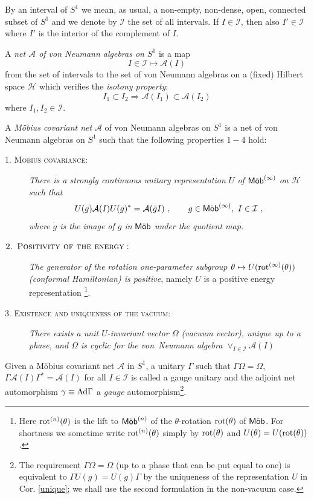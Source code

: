 \documentclass[11pt]{article}
\def\Ad{{\hbox{\rm Ad}}}
\def\g{\gamma}
\def\Ga{\Gamma}
\def\Om{\Omega}
\def\A{{\cal A}}
\def\I{{\cal I}}
\def\H{{\cal H}}
\def\Mob{{\rm\textsf{M\"ob}}}
\def\Mobn{{\rm\textsf{M\"ob}}^{(n)}}
\def\Mobi{{\rm\textsf{M\"ob}}^{(\infty)}}
\def\A{{\mathcal A}}
\def\H{{\mathcal H}}
\def\I{{\mathcal I}}
\begin{document}
By an interval of $S^1$ we mean, as usual, a non-empty, non-dense, open, connected subset of $S^1$ and we denote by $\I$ the set of all intervals. If $I\in\I$, then also $I'\in\I$ where $I'$ is the interior of the complement of $I$. 

A {\it  net $\A$ of von Neumann algebras on $S^1$} is a map
\[
I\in\I\mapsto\A(I)
\]
from the set of intervals to the set of von Neumann algebras on a
(fixed) Hilbert space $\H$ which verifies the \emph{isotony property}:
\[
I_1\subset I_2\Rightarrow  \A(I_1)\subset\A(I_2)
\]
where $I_1 , I_2\in\I$.

A \emph{M\"obius covariant net} $\A$ of von Neumann algebras on $S^1$ is a net of von Neumann algebras on $S^1$ such that the following properties $1-4$ hold:
%
\begin{description}
\item[\textnormal{\textsc{1. M\"obius covariance}}:] {\it There is a
strongly continuous unitary representation $U$ of} $\Mobi$ {\it on $\H$ such that}
\[
U(g)\A(I)U(g)^*=\A(\dot{g}I)\ ,
\qquad g\in \Mobi,\ I\in\I \ ,
\]
{\it where $\dot{g}$ is the image of $g$ in} $\Mob$ {\it under the quotient map.}
\end{description}
%	
\begin{description}
\item[$\textnormal{\textsc{2. Positivity of the energy}}:$]
{\it The generator of the rotation one-para\-meter subgroup 
$\theta\mapsto U({\rm rot}^{(\infty)}(\theta))$ 
(conformal Hamiltonian) is positive}, na\-me\-ly $U$ is a positive energy representation
\footnote{Here ${\rm rot}^{(n)}(\theta)$ is the lift to $\Mobn$ of the $\theta$-rotation ${\rm rot}(\theta)$ of $\Mob$. For shortness we sometime write ${\rm rot}^{(n)}(\theta)$ simply by ${\rm rot}(\theta)$ and $U(\theta) = U({\rm rot}(\theta))$.}. 
\end{description}
%
\begin{description}
\item[\textnormal{\textsc{3. Existence and uniqueness of the vacuum}}:]
{\it There exists a unit $U$-invariant vector $\Omega$ 
(vacuum vector), unique up to a phase, and $\Omega$ is
cyclic for the von~Neumann algebra $\vee_{I\in\I}\A(I)$}
\end{description}
%
Given a M\"obius covariant net $\A$ in $S^1$, a unitary $\Ga$ such that $\Ga\Om = \Om$, $\Ga\A(I)\Ga^* =\A(I)$ for all $I\in\I$ is called a gauge unitary and the adjoint net automorphism $\g\equiv\Ad\Ga$ a \emph{gauge} automorphism\footnote{The requirement $\Ga\Om =\Om$ (up to a phase that can be put equal to one) is equivalent to $\Ga U(g) = U(g)\Ga$ by the uniqueness of the representation $U$ in Cor. \ref{unique}; we shall use the second formulation in the non-vacuum case.}. 
\end{document}
